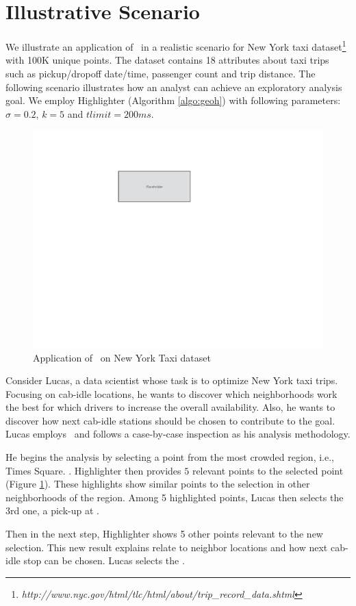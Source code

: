 \section{Illustrative Scenario}\label{sec:scenarios}
We illustrate an application of \framework\ in a realistic scenario for New York taxi dataset\footnote{\it http://www.nyc.gov/html/tlc/html/about/trip_record_data.shtml} \cite{ferreira2013visual} with 100K unique points. The dataset contains 18 attributes about taxi trips such as pickup/dropoff date/time, passenger count and trip distance. The following scenario illustrates how an analyst can achieve an exploratory analysis goal. We employ {\sc Highlighter} (Algorithm \ref{algo:geoh}) with following parameters: $\sigma = 0.2$, $k = 5$ and $tlimit = 200ms$. 

\begin{figure}
  \centering
  \includegraphics[width=\columnwidth]{figs/placeholder}
\caption{Application of \framework\ on New York Taxi dataset}
\label{fig:app}
\end{figure}

\vspace{5pt}
Consider Lucas, a data scientist whose task is to optimize New York taxi trips. Focusing on cab-idle locations, he wants to discover which neighborhoods work the best for which drivers to increase the overall availability. Also, he wants to discover how next cab-idle stations should be chosen to contribute to the goal. Lucas employs \framework\ and follows a case-by-case inspection as his analysis methodology.

He begins the analysis by selecting a point from the most crowded region, i.e., Times Square. . {\sc Highlighter} then provides $5$ relevant points to the selected point (Figure \ref{fig:app}). These highlights show similar points to the selection in other neighborhoods of the region. Among 5 highlighted points, Lucas then selects the 3rd one, a pick-up at .

Then in the next step, {\sc Highlighter} shows 5 other points relevant to the new selection. This new result explains  relate to neighbor locations and how next cab-idle stop can be chosen. Lucas selects the .